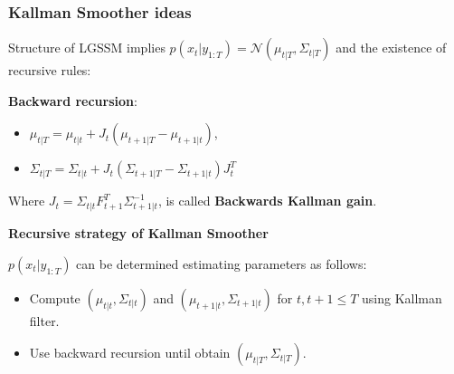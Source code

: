 \documentclass[xcolor=dvipsnames, compress]{beamer}
\begin{document}
\begin{frame}
\frametitle{Kallman Smoother ideas}

Structure of LGSSM implies $p(x_t| y_{1:T})=\mathcal{N}( \mu_{t|T}, \Sigma_{t|T}  )$ and the existence of recursive rules: \vspace{0.5cm}

\textbf{Backward recursion}:
\begin{itemize}
	\item $\mu_{t|T} = \mu_{t|t} + J_t (\mu_{t+1|T} - \mu_{t+1|t})$, 
	\item $\Sigma_{t|T} = \Sigma_{t|t} + J_t (\Sigma_{t+1|T} - \Sigma_{t+1|t})J_t^T$
\end{itemize}
\vspace{0.5cm}
Where $J_t = \Sigma_{t|t} F_{t+1}^T \Sigma_{t+1|t}^{-1}$, is called \textbf{Backwards Kallman gain}.

\end{frame}

\begin{frame}

\textbf{Recursive strategy of Kallman Smoother}

$p(x_t|y_{1:T})$ can be determined estimating parameters as follows:

\begin{itemize}
	\item Compute $(\mu_{t|t}, \Sigma_{t|t})$ and $(\mu_{t+1|t}, \Sigma_{t+1|t})$ for $t,t+1 \leq T$ using Kallman filter.
	\item Use backward recursion until obtain $(\mu_{t|T}, \Sigma_{t|T})$.
\end{itemize}


\end{frame}

%
 
\end{document}
